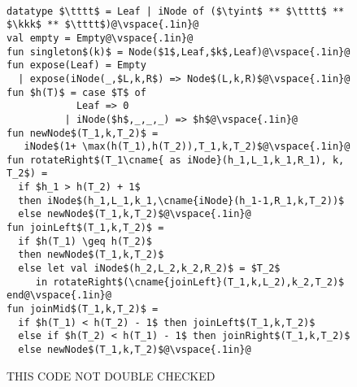 \begin{figure}
\begin{datastructure}~
\begin{lstlisting}
datatype $\tttt$ = Leaf | iNode of ($\tyint$ ** $\tttt$ ** $\kkk$ ** $\tttt$)@\vspace{.1in}@
val empty = Empty@\vspace{.1in}@
fun singleton$(k)$ = Node($1$,Leaf,$k$,Leaf)@\vspace{.1in}@
fun expose(Leaf) = Empty
  | expose(iNode(_,$L,k,R$) => Node$(L,k,R)$@\vspace{.1in}@
fun $h(T)$ = case $T$ of 
            Leaf => 0
          | iNode($h$,_,_,_) => $h$@\vspace{.1in}@
fun newNode$(T_1,k,T_2)$ =
   iNode$(1+ \max(h(T_1),h(T_2)),T_1,k,T_2)$@\vspace{.1in}@
fun rotateRight$(T_1\cname{ as iNode}(h_1,L_1,k_1,R_1), k, T_2$) =
  if $h_1 > h(T_2) + 1$ 
  then iNode$(h_1,L_1,k_1,\cname{iNode}(h_1-1,R_1,k,T_2))$
  else newNode$(T_1,k,T_2)$@\vspace{.1in}@
fun joinLeft$(T_1,k,T_2)$ =
  if $h(T_1) \geq h(T_2)$ 
  then newNode$(T_1,k,T_2)$
  else let val iNode$(h_2,L_2,k_2,R_2)$ = $T_2$
     in rotateRight$(\cname{joinLeft}(T_1,k,L_2),k_2,T_2)$ end@\vspace{.1in}@
fun joinMid$(T_1,k,T_2)$ =
  if $h(T_1) < h(T_2) - 1$ then joinLeft$(T_1,k,T_2)$
  else if $h(T_2) < h(T_1) - 1$ then joinRight$(T_1,k,T_2)$
  else newNode$(T_1,k,T_2)$@\vspace{.1in}@
\end{lstlisting}
THIS CODE NOT DOUBLE CHECKED
\begin{comment}
Not including the following since it is redundant.
removeMin and join are common among implementations.
joinRight is by symmetry
\begin{lstlisting}
fun rotateLeft$(T_1,k,T_2 \cname{ as Node}(h_2,L_2,k_2,R_2))$ =
  if $h_2 > h(T_1) + 1$ 
  then Node$(h_2,\cname{Node}(h_2-1,T_1,k,L_2),k_2,R_2)$
  else newNode$(T_1,k,T_2)$@\vspace{.1in}@
fun joinRight$(T_1,k,T_2)$ =
  if $h(T_2) \geq h(T_1)$ then newNode$(T_1,k,T_2)$
  else let val Node$(h_1,L_1,k_1,R_1)$ = $T_1$
     in rotateLeft$(L_1,k_1,\cname{joinRight}(R_1,k,T_2))$ end@\vspace{.1in}@
fun removeMin$(T)$ =
  case $T$ of
    Node$(\_,\cname{Leaf},k,\_)$ => $(k,R)$
  | Node$(\_,L,k,R)$ =>
      let val $(m,L')$ = removeMin$(L)$
      in $(m,\cname{rotateLeft}(L',k,R))$ end@\vspace{.1in}@
fun join$(T_1,m,T_2)$ =
  case ($m$,$T_2$) of
    (Some(k),_) => joinMid$(T_1,k,T_2)$
  | (None,Leaf) => $T_1$
  | (None,_) => 
      let val $(k,T_2')$ = removeMin$(T_2)$
      in joinMid$(T_1,k,T_2')$ end
\end{lstlisting}
\end{comment}
\end{datastructure}
\end{figure}

\flushchapter

